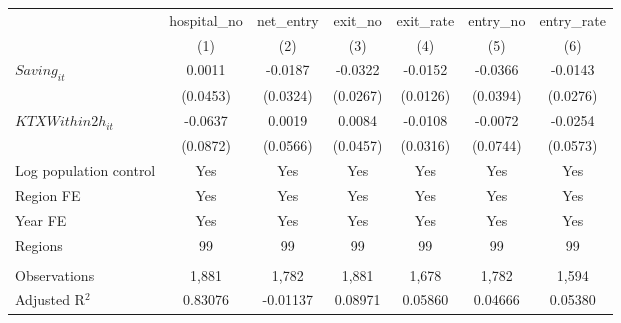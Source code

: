 \begingroup
\centering
\begin{tabular}{lcccccc}
   \toprule
                          & hospital\_no  & net\_entry  & exit\_no  & exit\_rate  & entry\_no  & entry\_rate \\    
                          & (1)           & (2)         & (3)       & (4)         & (5)        & (6)\\  
   \midrule 
   $Saving_{it}$          & 0.0011        & -0.0187     & -0.0322   & -0.0152     & -0.0366    & -0.0143\\   
                          & (0.0453)      & (0.0324)    & (0.0267)  & (0.0126)    & (0.0394)   & (0.0276)\\   
   $KTXWithin2h_{it}$     & -0.0637       & 0.0019      & 0.0084    & -0.0108     & -0.0072    & -0.0254\\   
                          & (0.0872)      & (0.0566)    & (0.0457)  & (0.0316)    & (0.0744)   & (0.0573)\\   
   Log population control & Yes           & Yes         & Yes       & Yes         & Yes        & Yes\\  
   Region FE              & Yes           & Yes         & Yes       & Yes         & Yes        & Yes\\  
   Year FE                & Yes           & Yes         & Yes       & Yes         & Yes        & Yes\\  
   Regions                & 99            & 99          & 99        & 99          & 99         & 99\\  
    \\
   Observations           & 1,881         & 1,782       & 1,881     & 1,678       & 1,782      & 1,594\\  
   Adjusted R$^2$         & 0.83076       & -0.01137    & 0.08971   & 0.05860     & 0.04666    & 0.05380\\  
   \bottomrule
\end{tabular}
\par\endgroup
